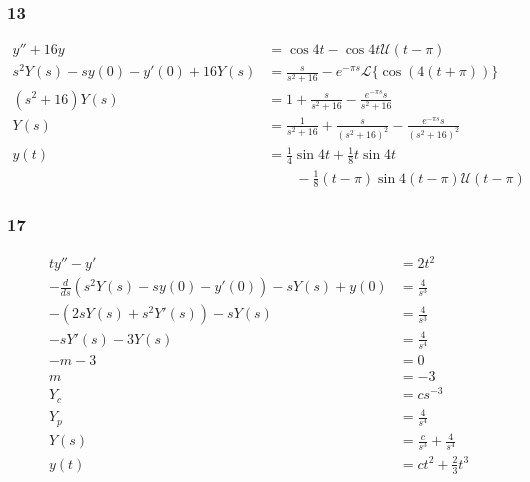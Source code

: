 \documentclass{article}
\begin{document}
\subsubsection{13}

\begin{align*}
  y'' + 16 y                          & = \cos 4 t - \cos 4 t \mathcal{U} (t - \pi)                                       \\
  s^2 Y(s) - s y(0) - y'(0) + 16 Y(s) & = \frac{s}{s^2 + 16} - e^{-\pi s} \mathcal{L}\{\cos (4 (t + \pi))\}               \\
  (s^2 + 16) Y(s)                     & = 1 + \frac{s}{s^2 + 16} - \frac{e^{-\pi s} s}{s^2 + 16}                          \\
  Y(s)                                & = \frac{1}{s^2 + 16} + \frac{s}{(s^2 + 16)^2} - \frac{e^{-\pi s} s}{(s^2 + 16)^2} \\
  y(t)                                & = \frac{1}{4} \sin 4 t + \frac{1}{8} t \sin 4 t                                   \\
                                      & \qquad - \frac{1}{8} (t - \pi) \sin 4 (t - \pi) \mathcal{U}(t - \pi)
\end{align*}

\subsubsection{17}

\begin{align*}
  t y'' - y'                                                 & = 2 t^2                         \\
  -\frac{d}{d s} (s^2 Y(s) - s y(0) - y'(0)) - s Y(s) + y(0) & = \frac{4}{s^3}                 \\
  -(2 s Y(s) + s^2 Y'(s)) - s Y(s)                           & = \frac{4}{s^3}                 \\
  -s Y'(s) - 3 Y(s)                                          & = \frac{4}{s^4}                 \\
  -m - 3                                                     & = 0                             \\
  m                                                          & = -3                            \\
  Y_c                                                        & = c s^{-3}                      \\
  Y_p                                                        & = \frac{4}{s^4}                 \\
  Y(s)                                                       & = \frac{c}{s^3} + \frac{4}{s^4} \\
  y(t)                                                       & = c t^2 + \frac{2}{3} t^3
\end{align*}
\end{document}
